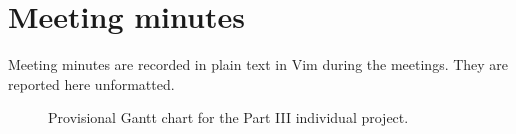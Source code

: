 \documentclass[paper=letter, fontsize=11pt]{article}
\begin{document}
\section*{Meeting minutes}

Meeting minutes are recorded in plain text in Vim during the meetings. They are reported here unformatted. \\[1cm]


	\resizebox{\textwidth}{!}{
	
	}

	\resizebox{\textwidth}{!}{

}


\begin{figure}
	\centering
\caption{Provisional Gantt chart for the Part III individual project.}
	\label{f:ganttchart}
\end{figure}
%	
%
%	
\newpage
\clearpage


%
\newpage

\end{document}
